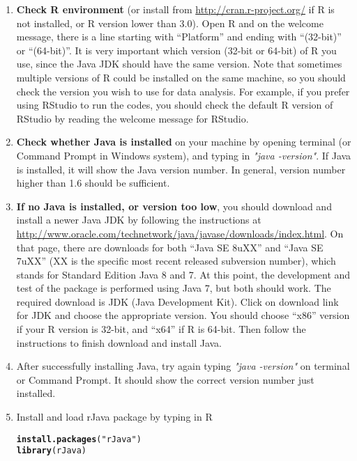 \documentclass{article}\usepackage[]{graphicx}\usepackage[]{color}
\makeatletter
\newcommand{\hlstr}[1]{\textcolor[rgb]{0.192,0.494,0.8}{#1}}%
\newcommand{\hlstd}[1]{\textcolor[rgb]{0.345,0.345,0.345}{#1}}%
\newcommand{\hlkwd}[1]{\textcolor[rgb]{0.737,0.353,0.396}{\textbf{#1}}}%
\newenvironment{kframe}{%
 \def\at@end@of@kframe{}%
 \ifinner\ifhmode%
  \def\at@end@of@kframe{\end{minipage}}%
  \begin{minipage}{\columnwidth}%
 \fi\fi%
 \def\FrameCommand##1{\hskip\@totalleftmargin \hskip-\fboxsep
 \colorbox{shadecolor}{##1}\hskip-\fboxsep
     \hskip-\linewidth \hskip-\@totalleftmargin \hskip\columnwidth}%
 \MakeFramed {\advance\hsize-\width
   \@totalleftmargin\z@ \linewidth\hsize
   \@setminipage}}%
 {\par\unskip\endMakeFramed%
 \at@end@of@kframe}
\newenvironment{knitrout}{}{} %
\makeatother
\begin{document}
\begin{enumerate}
	\item \textbf{Check R environment} (or install from \url{http://cran.r-project.org/} if R is not installed, or R version lower than 3.0). Open R and on the welcome message, there is a line starting with ``Platform'' and ending with ``(32-bit)'' or ``(64-bit)''. It is very important which version (32-bit or 64-bit) of R you use, since the Java JDK should have the same version. Note that sometimes multiple versions of R could be installed on the same machine, so you should check the version you wish to use for data analysis. For example, if you prefer using RStudio to run the codes, you should check the default R version of RStudio by reading the welcome message for RStudio.   
 	\item \textbf{Check whether Java is installed} on your machine by opening terminal (or Command Prompt in Windows system), and typing in \textit{"java -version"}. If Java is installed, it will show the Java version number. In general, version number higher than 1.6 should be sufficient. 
 	\item \textbf{If no Java is installed, or version too low}, you should download and install a newer Java JDK by following the instructions at \url{http://www.oracle.com/technetwork/java/javase/downloads/index.html}. On that page, there are downloads for both ``Java SE 8uXX'' and ``Java SE 7uXX'' (XX is the specific most recent released subversion number), which stands for Standard Edition Java 8 and 7. At this point, the development and test of the package is performed using Java 7, but both should work. The required download is JDK (Java Development Kit). Click on download link for JDK and choose the appropriate version. You should choose ``x86'' version if your R version is 32-bit, and ``x64''  if R is 64-bit. Then follow the instructions to finish download and install Java.
 	\item After successfully installing Java, try again typing \textit{"java -version"} on terminal or Command Prompt. It should show the correct version number just installed.
 	\item Install and load rJava package by typing in R
\begin{knitrout}
\color{fgcolor}\begin{kframe}
\begin{alltt}
\hlkwd{install.packages}\hlstd{(}\hlstr{"rJava"}\hlstd{)}
\hlkwd{library}\hlstd{(rJava)}
\end{alltt}

\end{kframe}
\end{knitrout}
\end{enumerate}
\end{document}
